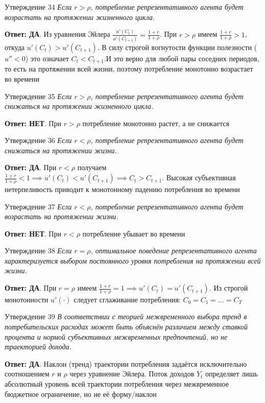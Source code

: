 \documentclass[10pt,a4paper]{article}
\newcommand{\qda}{\textbf{\color{yesgreen}Ответ: ДА}}
\newcommand{\qnet}{\textbf{\color{nored}Ответ: НЕТ}}
\newenvironment{answer}[2]{%
  \begin{qbox}{Утверждение #1}
  \textit{#2}\par\smallskip
}{%
  \end{qbox}\vspace{2pt}
}
\begin{document}
\begin{answer}{34}{Если $r > \rho$, потребление репрезентативного агента будет возрастать на протяжении жизненного цикла.}
\qda. Из уравнения Эйлера $\frac{u'(C_t)}{u'(C_{t+1})} = \frac{1+r}{1+\rho}$. При $r > \rho$ имеем $\frac{1+r}{1+\rho} > 1$, откуда $u'(C_t) > u'(C_{t+1})$. В силу строгой вогнутости функции полезности ($u'' < 0$) это означает $C_t < C_{t+1}$.И это верно для любой пары соседних периодов, то есть на протяжении всей жизни, поэтому потребление монотонно возрастает во времени
\end{answer}

\begin{answer}{35}{Если $r > \rho$, потребление репрезентативного агента будет снижаться на протяжении жизненного цикла.}
\qnet. При $r > \rho$ потребление монотонно растет, а не снижается
\end{answer}

\begin{answer}{36}{Если $r < \rho$, потребление репрезентативного агента будет снижаться на протяжении жизни.}
\qda. При $r < \rho$ получаем $\frac{1+r}{1+\rho} < 1 \implies u'(C_t) < u'(C_{t+1}) \implies C_t > C_{t+1}$. Высокая субъективная нетерпеливость приводит к монотонному падению потребления во времени
\end{answer}

\begin{answer}{37}{Если $r < \rho$, потребление репрезентативного агента будет возрастать на протяжении жизни.}
\qnet. При $r < \rho$ потребление убывает во времени
\end{answer}

\begin{answer}{38}{Если $r = \rho$, оптимальное поведение репрезентативного агента характеризуется выбором постоянного уровня потребления на протяжении всей жизни.}
\qda. При $r = \rho$ имеем $\frac{1+r}{1+\rho} = 1 \implies u'(C_t) = u'(C_{t+1})$. Из строгой монотонности $u'(\cdot)$ следует сглаживание потребления: $C_0 = C_1 = \dots = C_T$
\end{answer}

\begin{answer}{39}{В соответствии с теорией межвременного выбора тренд в потребительских расходах может быть объяснён различием между ставкой процента и нормой субъективных межвременных предпочтений, но не траекторией дохода.}
\qda. Наклон (тренд) траектории потребления задаётся исключительно соотношением $r$ и $\rho$ через уравнение Эйлера. Поток доходов $Y_t$ определяет лишь абсолютный уровень всей траектории потребления через межвременное бюджетное ограничение, но не её форму/наклон
\end{answer}
\end{document}
